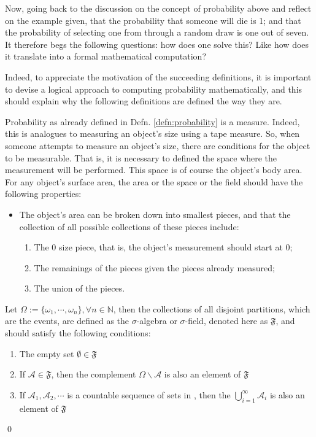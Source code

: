 Now, going back to the discussion on the concept of probability above and reflect on the example given, that the probability that someone will die is 1; and that the probability of selecting one   from   through a random draw is one out of seven. It therefore begs the following questions: how does one solve this? Like how does it translate into a formal mathematical computation?

Indeed, to appreciate the motivation of the succeeding definitions, it is important to devise a logical approach to computing probability mathematically, and this should explain why the following definitions are defined the way they are.

Probability as already defined in Defn. \ref{defn:probability} is a measure. Indeed, this is analogues to measuring an object's size using a tape measure. So, when someone attempts to measure an object's size, there are conditions for the object to be measurable. That is, it is necessary to defined the space where the measurement will be performed. This space is of course the object's body area. For any object's surface area, the area or the space or the field should have the following properties:
\begin{itemize}
    \item The object's area can be broken down into smallest pieces, and that the collection of all possible collections of these pieces include:
    \begin{enumerate}
        \item The 0 size piece, that is, the object's measurement should start at 0;
        \item The remainings of the pieces given the pieces already measured;
        \item The union of the pieces.
    \end{enumerate}
\end{itemize}
\begin{defnx}\label{defn:sigma_algebra}
Let $\Omega:=\{\omega_1,\cdots,\omega_n\}, \forall n\in\mathbb{N}$, then the collections of all disjoint partitions, which are the events, are defined as the $\sigma$-algebra or $\sigma$-field, denoted here as $\mathfrak{F}$, and should satisfy the following conditions:
\begin{enumerate}
    \item The empty set $\emptyset\in\mathfrak{F}$
    \item If $\mathscr{A}\in\mathfrak{F}$, then the complement $\Omega\backslash\mathscr{A}$ is also an element of $\mathfrak{F}$
    \item If $\mathscr{A}_1,\mathscr{A}_2,\cdots$ is a countable sequence of sets in , then the $\bigcup_{i=1}^{\infty}\mathscr{A}_i$ is also an element of $\mathfrak{F}$
\end{enumerate}\qed
\end{defnx}
